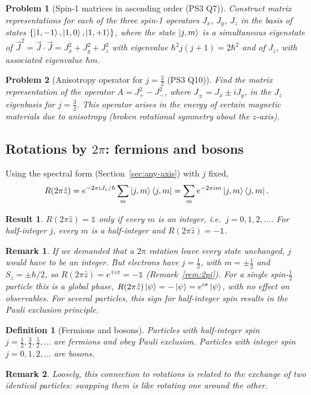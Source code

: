 \documentclass{article}
\newtheorem{definition}{Definition}
\newtheorem{problem}{Problem}
\newtheorem{remark}{Remark}
\newtheorem{result}{Result}
\newcommand{\id}{\mathds{1}}
\begin{document}
\begin{problem}[Spin-1 matrices in ascending order (PS3 Q7)]
    Construct matrix representations for each of the three spin-1 operators $J_x$, $J_y$, $J_z$ in the basis of states $\{\ket{1,-1}, \ket{1,0}, \ket{1,+1}\}$, where the state $\ket{j,m}$ is a simultaneous eigenstate of $\vec{J}^2 = \vec{J}\cdot\vec{J} = J_x^2 + J_y^2 + J_z^2$ with eigenvalue $\hbar^2j(j+1) = 2\hbar^2$ and of $J_z$, with associated eigenvalue $\hbar m$.
\end{problem}
\begin{problem}[Anisotropy operator for $j = \tfrac32$ (PS3 Q10)]
    Find the matrix representation of the operator $A = J_+^2 - J_-^2$, where $J_\pm = J_x \pm iJ_y$, in the $J_z$ eigenbasis for $j = \tfrac32$. This operator arises in the energy of certain magnetic materials due to anisotropy (broken rotational symmetry about the $z$-axis).
\end{problem}

\subsection{\texorpdfstring{Rotations by $2\pi$: fermions and bosons}{Rotations by 2pi: fermions and bosons}}
\label{sec:fermions}
Using the spectral form (Section~\ref{sec:any-axis}) with $j$ fixed,
\[R(2\pi\hat{z}) = e^{-2\pi iJ_z/\hbar}\sum_m\ket{j,m}\bra{j,m} = \sum_m e^{-2\pi im}\ket{j,m}\bra{j,m}.\]
\begin{result}
    $R(2\pi\hat{z}) = \id$ only if every $m$ is an integer, i.e.\ $j = 0, 1, 2, \dots$. For half-integer $j$, every $m$ is a half-integer and $R(2\pi\hat{z}) = -\id$.
\end{result}
\begin{remark}
    If we demanded that a $2\pi$ rotation leave every state unchanged, $j$ would have to be an integer. But electrons have $j = \tfrac12$, with $m = \pm\tfrac12$ and $S_z = \pm\hbar/2$, so $R(2\pi\hat{z}) = e^{\mp i\pi} = -\id$ (Remark~\ref{rem:2pi}). For a single spin-$\tfrac12$ particle this is a global phase, $R(2\pi\hat{z})\ket{\psi} = -\ket{\psi} = e^{i\pi}\ket{\psi}$, with no effect on observables. For several particles, this sign for half-integer spin results in the Pauli exclusion principle.
\end{remark}
\begin{definition}[Fermions and bosons]
    Particles with half-integer spin $j = \tfrac12, \tfrac32, \tfrac52, \dots$ are \emph{fermions} and obey Pauli exclusion. Particles with integer spin $j = 0, 1, 2, \dots$ are \emph{bosons}.
\end{definition}
\begin{remark}
    Loosely, this connection to rotations is related to the \emph{exchange} of two identical particles: swapping them is like rotating one around the other.
\end{remark}
\end{document}
